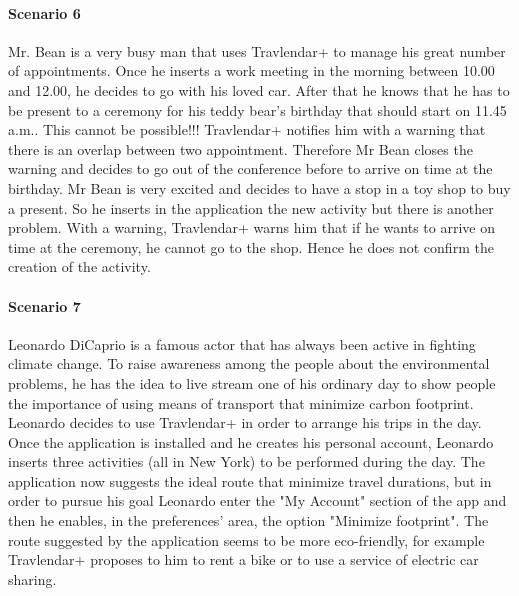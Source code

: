 \documentclass[12pt,titlepage]{article}
\begin{document}
\paragraph{Scenario 6}
Mr. Bean is a very busy man that uses Travlendar+ to manage his great number of appointments. Once he inserts a work meeting in the morning between 10.00 and 12.00, he decides to go with his loved car. After that he knows that he has to be present to a ceremony for his teddy bear's birthday that should start on 11.45 a.m.. This cannot be possible!!! Travlendar+ notifies him with a warning that there is an overlap between two appointment. Therefore Mr Bean closes the warning and decides to go out of the conference before to arrive on time at the birthday.
Mr Bean is very excited and decides to have a stop in a toy shop to buy a present. So he inserts in the application the new activity but there is another problem. With a warning, Travlendar+ warns him that if he wants to arrive on time at the ceremony, he cannot go to the shop. Hence he does not confirm the creation of the activity.

\paragraph{Scenario 7}
Leonardo DiCaprio is a famous actor that has always been active in fighting climate change. To raise awareness among the people about the environmental problems, he has the idea to live stream one of his ordinary day to show people the importance of using means of transport that minimize carbon footprint. 
Leonardo decides to use Travlendar+ in order to arrange his trips in the day. Once the application is installed and he creates his personal account, Leonardo inserts three activities (all in New York) to be performed during the day. The application now suggests the ideal route that minimize travel durations, but in order to pursue his goal Leonardo enter the "My Account" section of the app and then he enables, in the preferences' area, the option "Minimize footprint". The route suggested by the application seems to be more eco-friendly, for example Travlendar+ proposes to him to rent a bike or to use a service of electric car sharing.
\end{document}
